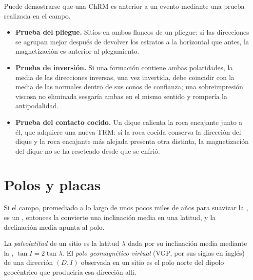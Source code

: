 \begin{method}\label{met:b3:palaeomagnetism:tests}
Puede demostrarse que una ChRM es anterior a un evento mediante una prueba realizada en el campo.
\begin{itemize}
  \item \textbf{Prueba del pliegue.} Sitios en ambos flancos de un pliegue: si las direcciones
        se agrupan mejor después de devolver los estratos a la horizontal que antes,
        la magnetización es anterior al plegamiento.
  \item \textbf{Prueba de inversión.} Si una formación contiene ambas polaridades, la media
        de las direcciones inversas, una vez invertida, debe coincidir con la media de
        las normales dentro de sus conos de confianza; una sobreimpresión viscosa no
        eliminada sesgaría ambas en el mismo sentido y rompería la antipodalidad.
  \item \textbf{Prueba del contacto cocido.} Un dique calienta la roca encajante junto a él,
        que adquiere una nueva TRM: si la roca cocida conserva la dirección del dique y
        la roca encajante más alejada presenta otra distinta, la magnetización del dique
        no se ha reseteado desde que se enfrió.
\end{itemize}
\end{method}

\section{Polos y placas}

Si el campo, promediado a lo largo de unos pocos miles de años para suavizar la
, es un , entonces la  convierte una
inclinación media en una latitud, y la declinación media apunta al polo.

\begin{definition}\label{def:b3:palaeomagnetism:vgp}
La \emph{paleolatitud} de un sitio es la latitud
$\lambda$ dada por su inclinación media mediante la , $\tan I =
2\tan\lambda$. El \emph{polo geomagnético virtual}
(VGP, por sus siglas en inglés) de una dirección $(D, I)$ observada en un sitio es el polo
norte del dipolo geocéntrico que produciría esa dirección allí.
\end{definition}


